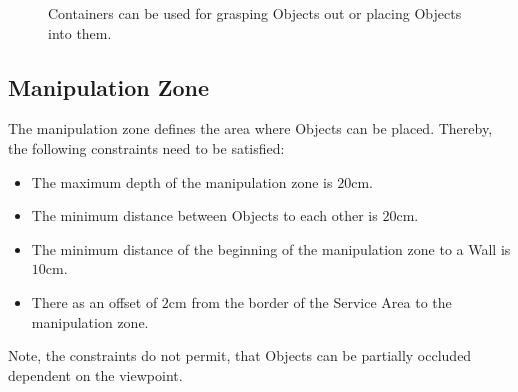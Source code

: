\begin{figure} [h!]
	\begin{center}
		\hspace{0.05\textwidth}
	\end{center}
	\caption{Containers can be used for grasping Objects out or placing Objects into them.}
	\label{fig:containers}
\end{figure}




\subsection{Manipulation Zone} \label{ssec:ManipulationZone}
The manipulation zone defines the area where Objects can be placed. Thereby, the following constraints need to be satisfied:
\begin{itemize}
	\item The maximum depth of the manipulation zone is $20\si{\centi\meter}$.
	\item The minimum distance between Objects to each other is $20\si{\centi\meter}$.
	\item The minimum distance of the beginning of the manipulation zone to a Wall is $10\si{\centi\meter}$.
	\item There as an offset of $2\si{\centi\meter}$ from the border of the Service Area to the manipulation zone.
\end{itemize}
Note, the constraints do not permit, that Objects can be partially occluded dependent on the viewpoint.

